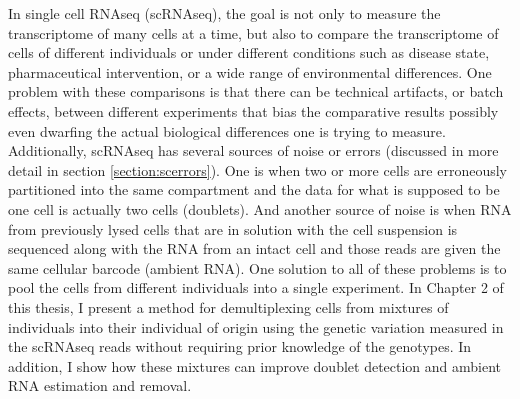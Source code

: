 \par{
In single cell RNAseq (scRNAseq), the goal is not only to measure the transcriptome of many cells at a time, but also to compare the transcriptome of cells of different individuals or under different conditions such as disease state, pharmaceutical intervention, or a wide range of environmental differences. One problem with these comparisons is that there can be technical artifacts, or batch effects, between different experiments that bias the comparative results possibly even dwarfing the actual biological differences one is trying to measure. Additionally, scRNAseq has several sources of noise or errors (discussed in more detail in section \ref{section:scerrors}). One is when two or more cells are erroneously partitioned into the same compartment and the data for what is supposed to be one cell is actually two cells (doublets). And another source of noise is when RNA from previously lysed cells that are in solution with the cell suspension is sequenced along with the RNA from an intact cell and those reads are given the same cellular barcode (ambient RNA). One solution to all of these problems is to pool the cells from different individuals into a single experiment. In Chapter 2 of this thesis, I present a method for demultiplexing cells from mixtures of individuals into their individual of origin using the genetic variation measured in the scRNAseq reads without requiring prior knowledge of the genotypes. In addition, I show how these mixtures can improve doublet detection and ambient RNA estimation and removal.
} 

